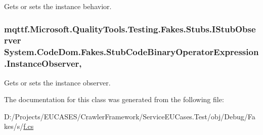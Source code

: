 Gets or sets the instance behavior.

\hypertarget{class_system_1_1_code_dom_1_1_fakes_1_1_stub_code_binary_operator_expression_ad06a5793903956ecec5d4fe30e4213ec}{
\subsubsection[{Instance\-Observer}]{\setlength{\rightskip}{0pt plus 5cm}mqttf.\-Microsoft.\-Quality\-Tools.\-Testing.\-Fakes.\-Stubs.\-I\-Stub\-Observer System.\-Code\-Dom.\-Fakes.\-Stub\-Code\-Binary\-Operator\-Expression.\-Instance\-Observer\hspace{0.3cm}{\ttfamily [get]}, {\ttfamily [set]}}}\label{class_system_1_1_code_dom_1_1_fakes_1_1_stub_code_binary_operator_expression_ad06a5793903956ecec5d4fe30e4213ec}


Gets or sets the instance observer.



The documentation for this class was generated from the following file\-:\begin{DoxyCompactItemize}
\item 
D\-:/\-Projects/\-E\-U\-C\-A\-S\-E\-S/\-Crawler\-Framework/\-Service\-E\-U\-Cases.\-Test/obj/\-Debug/\-Fakes/s/\hyperlink{s_2f_8cs}{f.\-cs}\end{DoxyCompactItemize}
